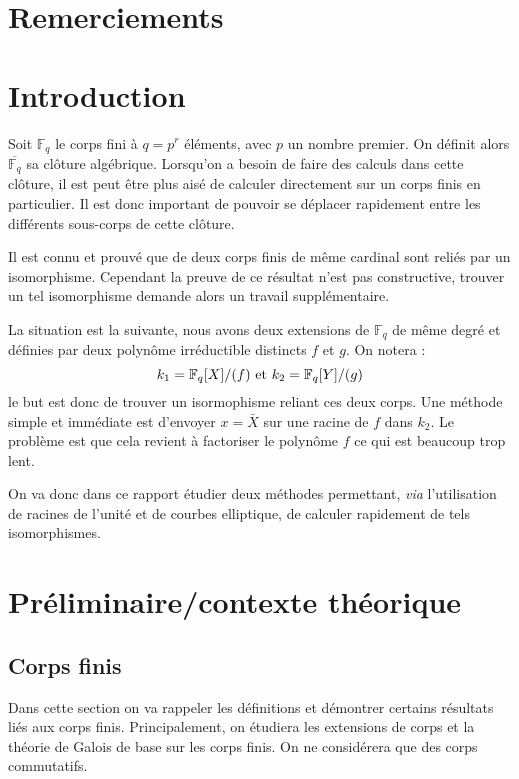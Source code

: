 \documentclass[a4paper]{article} %
\numberwithin{equation}{section}
\newcommand\GF[1]{\mathbb{F}_{#1}}
\begin{document}
\newtheorem{thm}{Thèorème}[section]
\newtheorem{lem}[thm]{Lemme}
\newtheorem{cor}{Corollaire}[thm]
\newtheorem{prop}[thm]{Proposition}
\theoremstyle{definition}
\newtheorem{defn}[thm]{Définition}
\newtheorem*{ex}{Exemple}
\theoremstyle{remark}
\newtheorem{rem}{Remarque}[thm]
\section*{Remerciements}
\section*{Introduction}
Soit $\GF{q}$ le corps fini à $q = p^r$ éléments, avec $p$ un nombre premier. On
définit alors $\overline{\GF{q}}$ sa clôture algébrique. Lorsqu'on a besoin de
faire des calculs dans cette clôture, il est peut être plus aisé de calculer
directement sur un corps finis en particulier. Il est donc important de pouvoir
se déplacer rapidement entre les différents sous-corps de cette clôture.\par
Il est connu et prouvé que de deux corps finis de même cardinal sont reliés par
un isomorphisme. Cependant la preuve de ce résultat n'est pas constructive,
trouver un tel isomorphisme demande alors un travail supplémentaire.\par
La situation est la suivante, nous avons deux extensions de $\GF{q}$ de même
degré et définies par deux polynôme irréductible distincts $f$ et $g$. On notera
:
\[k_1=\GF{q}[X]/(f)\textup{ et }k_2=\GF{q}[Y]/(g)\]
le but est donc de trouver un isormophisme reliant ces deux corps. Une méthode
simple et immédiate est d'envoyer $x = \bar{X}$ sur une racine de $f$ dans
$k_2$. Le problème est que cela revient à factoriser le polynôme $f$ ce qui est
beaucoup trop lent.\par
On va donc dans ce rapport étudier deux méthodes permettant, \textit{via}
l'utilisation de racines de l'unité et de courbes elliptique, de calculer
rapidement de tels isomorphismes.


\section{Préliminaire/contexte théorique}

\subsection{Corps finis}
Dans cette section on va rappeler les définitions et démontrer certains 
résultats liés aux corps finis. Principalement, on étudiera les extensions 
de corps et la théorie de Galois de base sur les corps finis. On ne considérera
que des corps commutatifs.
\end{document}
